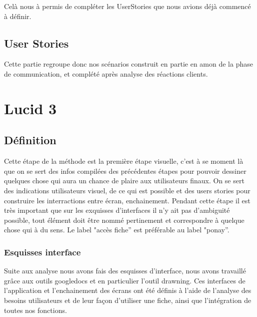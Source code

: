 \documentclass[11pt,a4paper]{article}
\begin{document}
Celà nous à permis de compléter les UserStories que nous avions déjà commencé à définir.\\

\subsection{User Stories}

Cette partie regroupe donc nos scénarios construit en partie en amon de la phase de communication, et complété après
analyse des réactions clients.










\section{Lucid 3}

\subsection{Définition}

Cette étape de la méthode est la première étape visuelle, c'est à se moment là
que on se sert des infos compilées des précédentes étapes pour pouvoir dessiner
quelques chose qui aura un chance de plaire aux utilisateurs finaux.
On se sert des indications utilisateurs visuel, de ce qui est possible et des
users stories pour construire les interractions entre écran, enchainement.
Pendant cette étape il est très important que sur les exquisses d'interfaces il
n'y ait pas d'ambiguité possible, tout élément doit être nommé pertinement et
correspondre à quelque chose qui à du sens. Le label "accès fiche'' est
préférable au label "ponay''. 


\subsubsection{Esquisses interface}

Suite aux analyse nous avons fais des esquisses d'interface,
nous avons travaillé grâce aux outils googledocs et en particulier l'outil drawning.
Ces interfaces de l'application et l'enchainement des écrans ont été définis à l'aide 
de l'analyse des besoins utilisateurs et de leur façon d'utiliser une fiche, ainsi que l'intégration de
toutes nos fonctions.\\
\end{document}
